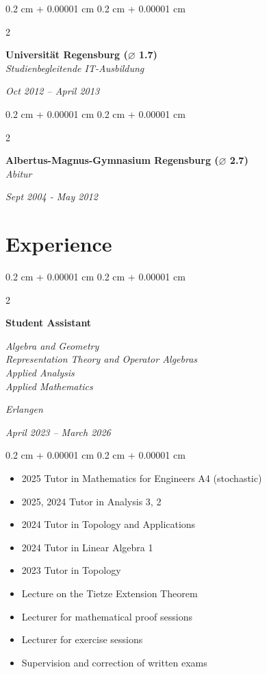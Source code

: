 \documentclass[10pt, letterpaper]{article}
\newenvironment{highlights}{
    \begin{itemize}[
        topsep=0.10 cm,
        parsep=0.10 cm,
        partopsep=0pt,
        itemsep=0pt,
        leftmargin=0.4 cm + 10pt
    ]
}{
    \end{itemize}
}
\newenvironment{onecolentry}{
    \begin{adjustwidth}{
        0.2 cm + 0.00001 cm
    }{
        0.2 cm + 0.00001 cm
    }
}{
    \end{adjustwidth}
}
\newenvironment{twocolentry}[2][]{
    \onecolentry
    \def\secondColumn{#2}
    \setcolumnwidth{\fill, 4.5 cm}
    \begin{paracol}{2}
}{
    \switchcolumn \raggedleft \secondColumn
    \end{paracol}
    \endonecolentry
}
\begin{document}
\vspace{0.10 cm}
\begin{twocolentry}{           
	\textit{Oct 2012 – April 2013}}
	\textbf{Universität Regensburg  ($\varnothing$ 1.7)} \\
	\textit{Studienbegleitende IT-Ausbildung}
\end{twocolentry}

\vspace{0.10 cm}
\begin{twocolentry}{           
	\textit{Sept 2004 - May 2012}}
	\textbf{Albertus-Magnus-Gymnasium Regensburg  ($\varnothing$ 2.7)} \\
	\textit{Abitur}
\end{twocolentry}



    
\section{Experience}
\begin{twocolentry}{
    \textit{Erlangen}    
    
    \textit{April 2023 – March 2026}}
    \textbf{Student Assistant}
    
    \textit{Algebra and Geometry \\ Representation Theory and Operator Algebras \\ Applied Analysis \\ Applied Mathematics}
\end{twocolentry}

\vspace{0.10 cm}
\begin{onecolentry}
	\begin{highlights}
		\item 2025 Tutor in Mathematics for Engineers A4 (stochastic)
        \item 2025, 2024 Tutor in Analysis 3, 2
        \item 2024 Tutor in Topology and Applications
        \item 2024 Tutor in Linear Algebra 1
        \item 2023 Tutor in Topology
        \item Lecture on the Tietze Extension Theorem
        \item Lecturer for mathematical proof sessions
        \item Lecturer for exercise sessions
        \item Supervision and correction of written exams
	\end{highlights}
\end{onecolentry}
\vspace{0.2 cm}
\end{document}
